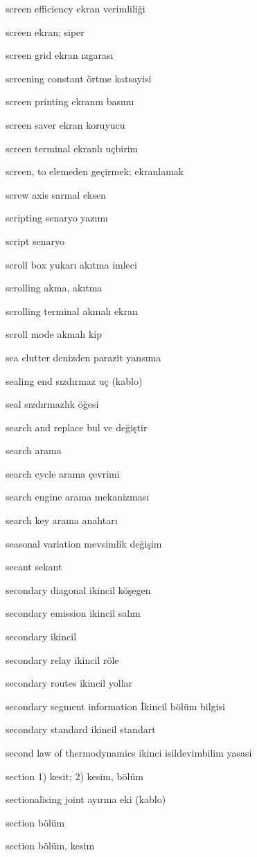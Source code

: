 \documentclass[12pt,fleqn]{article}\usepackage{../../common}
\begin{document}
screen efficiency ekran verimliliği

screen ekran; siper

screen grid ekran ızgarası

screening constant örtme katsayisi

screen printing ekranın basımı

screen saver ekran koruyucu

screen terminal ekranlı uçbirim

screen, to elemeden geçirmek; ekranlamak

screw axis sarmal eksen

scripting senaryo yazımı

script senaryo

scroll box yukarı akıtma imleci

scrolling akma, akıtma

scrolling terminal akmalı ekran

scroll mode akmalı kip

sea clutter denizden parazit yansıma

sealing end sızdırmaz uç (kablo)

seal sızdırmazlık öğesi

search and replace bul ve değiştir

search arama

search cycle arama çevrimi

search engine arama mekanizması

search key arama anahtarı

seasonal variation mevsimlik değişim

secant sekant

secondary diagonal ikincil köşegen

secondary emission ikincil salım

secondary ikincil

secondary relay ikincil röle

secondary routes ikincil yollar

secondary segment information İkincil bölüm bilgisi

secondary standard ikincil standart

second law of thermodynamics ikinci isildevimbilim yasasi

section 1) kesit; 2) kesim, bölüm

sectionalising joint ayırma eki (kablo)

section bölüm

section bölüm, kesim
\end{document}
